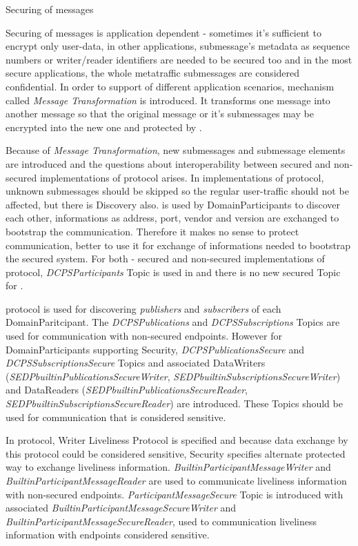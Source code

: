 \sec Securing of messages

Securing of messages is application dependent - sometimes it's sufficient to encrypt only user-data, in other applications, submessage's metadata as sequence numbers or writer/reader identifiers are needed to be secured too and in the most secure applications, the whole metatraffic submessages are considered confidential. In order to support of different application scenarios, mechanism called {\em Message Transformation} is introduced. It transforms one  message into another  message so that the original  message or it's submessages may be encrypted into the new one and protected by .

Because of {\em Message Transformation}, new submessages and submessage elements are introduced and the questions about interoperability between secured and non-secured implementations of  protocol arises. In implementations of  protocol, unknown submessages should be skipped so the regular user-traffic should not be affected, but there is Discovery also.  is used by DomainParticipants to discover each other, informations as  address, port, vendor and version are exchanged to bootstrap the communication. Therefore it makes no sense to protect  communication, better to use it for exchange of informations needed to bootstrap the secured system. For both - secured and non-secured implementations of  protocol, {\em DCPSParticipants} Topic is used in  and there is no new secured Topic for .

 protocol is used for discovering {\em publishers} and {\em subscribers} of each DomainParitcipant. The {\em DCPSPublications} and {\em DCPSSubscriptions} Topics are used for communication with non-secured endpoints. However for DomainParticipants supporting  Security, {\em DCPSPublicationsSecure} and {\em DCPSSubscriptionsSecure} Topics and associated DataWriters ({\em SEDPbuiltinPublicationsSecureWriter}, {\em SEDPbuiltinSubscriptionsSecureWriter}) and DataReaders ({\em SEDPbuiltinPublicationsSecureReader}, {\em SEDPbuiltinSubscriptionsSecureReader}) are introduced. These Topics should be used for communication that is considered sensitive.

In  protocol, Writer Liveliness Protocol is specified and because data exchange by this protocol could be considered sensitive,  Security specifies alternate protected way to exchange liveliness information. {\em BuiltinParticipantMessageWriter} and {\em BuiltinParticipantMessageReader} are used to communicate liveliness information with non-secured endpoints. {\em ParticipantMessageSecure} Topic is introduced with associated {\em BuiltinParticipantMessageSecureWriter} and {\em BuiltinParticipantMessageSecureReader}, used to communication liveliness information with endpoints considered sensitive.

